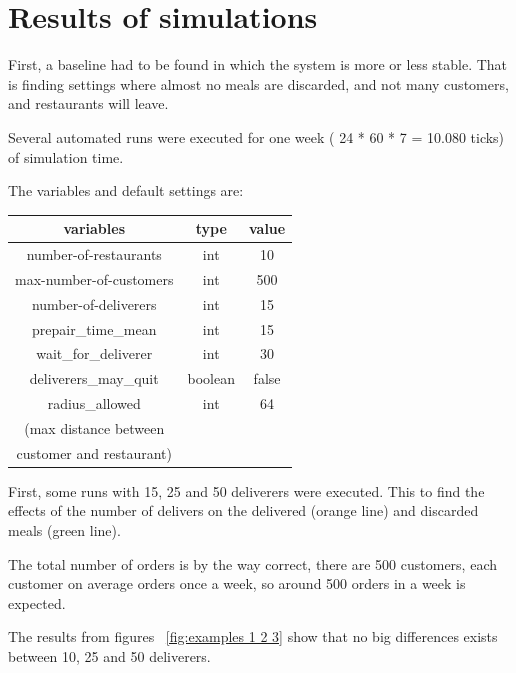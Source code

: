 \section{Results of simulations}\label{sec:results-of-simulations}
First, a baseline had to be found in which the system is more or less stable.
That is finding settings where almost no meals are discarded, and not many customers, and restaurants will leave.

Several automated runs were executed for one week ( 24 * 60 * 7 = 10.080 ticks) of simulation time.

The variables and default settings are:
\begin{center}
    \begin{tabular}{ |c|c|c| }
        \hline
        variables              & type & value \\
        \hline
        \hline
        number-of-restaurants & int & 10 \\
        \hline
        max-number-of-customers  & int & 500  \\
        \hline
        number-of-deliverers  & int & 15  \\
        \hline
        prepair\_time\_mean   & int & 15 \\
        \hline
        wait\_for\_deliverer  & int & 30 \\
        \hline
        deliverers\_may\_quit  & boolean & false  \\
        \hline
        radius\_allowed  & int & 64\\
        (max distance between &  &\\
        customer and restaurant)  & &\\
        \hline
    \end{tabular}
\end{center}

First, some runs with 15, 25 and 50 deliverers were executed.
This to find the effects of the number of delivers on the delivered (orange line) and discarded meals (green line).

The total number of orders is by the way correct, there are 500 customers, each customer on average orders once a week,
so around 500 orders in a week is expected.

The results from figures ~\ref{fig:examples 1 2 3} show that no big differences exists between 10, 25 and 50 deliverers.

